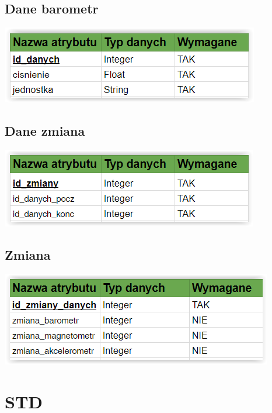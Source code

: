 \documentclass[11pt]{article}
\begin{document}
	\subsection{Dane barometr}
	\begin{center}
		\includegraphics[scale=1]{daneBarometr.PNG}
	\end{center}
	\subsection{Dane zmiana}
	\begin{center}
		\includegraphics[scale=1]{zmianaBarometr.PNG}
	\end{center}
	\subsection{Zmiana}
	\begin{center}
		\includegraphics[scale=1]{zmianaDanych.PNG}
	\end{center}
	\newpage
	\section{STD}
\end{document}
